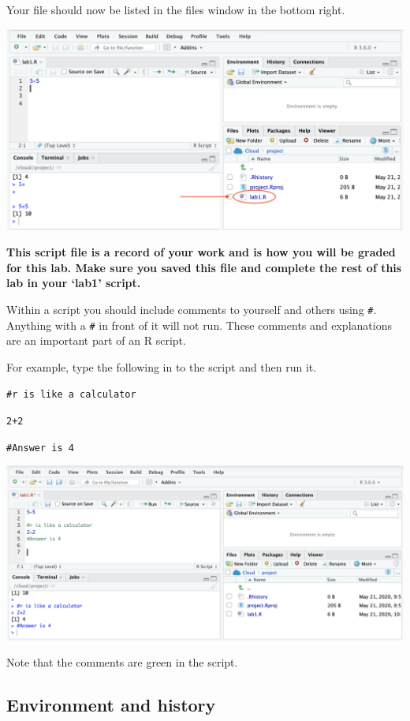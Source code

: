 \documentclass[
]{book}
\begin{document}
Your file should now be listed in the files window in the bottom right.

\includegraphics{img/savescript3.png}

\textbf{This script file is a record of your work and is how you will be graded for this lab. Make sure you saved this file and complete the rest of this lab in your `lab1' script.}

Within a script you should include comments to yourself and others using \texttt{\#}. Anything with a \texttt{\#} in front of it will not run. These comments and explanations are an important part of an R script.

For example, type the following in to the script and then run it.

\texttt{\#r\ is\ like\ a\ calculator}

\texttt{2+2}

\texttt{\#Answer\ is\ 4}

\includegraphics{img/comment.png}

Note that the comments are green in the script.

\hypertarget{environment-and-history}{%
\subsection{Environment and history}\label{environment-and-history}}
\end{document}
